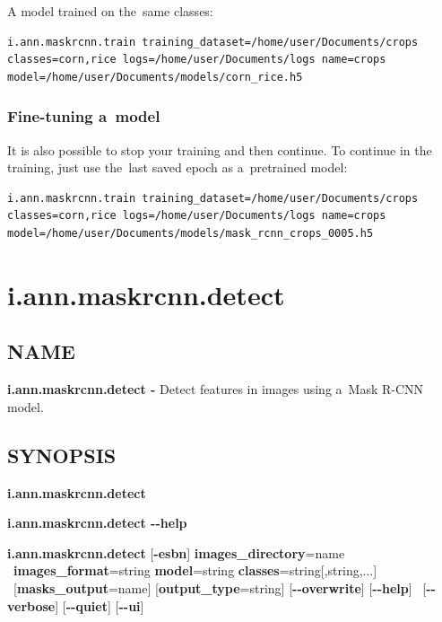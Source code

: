 A model trained on the~same classes:

{\footnotesize
\begin{lstlisting}[breaklines=true]
i.ann.maskrcnn.train training_dataset=/home/user/Documents/crops classes=corn,rice logs=/home/user/Documents/logs name=crops model=/home/user/Documents/models/corn_rice.h5
\end{lstlisting}
}

\subsubsection*{Fine-tuning a~model}
It is also possible to stop your training and then continue. To continue in the
training, just use the~last saved epoch as a~pretrained model:

{\footnotesize
\begin{lstlisting}[breaklines=true]
i.ann.maskrcnn.train training_dataset=/home/user/Documents/crops classes=corn,rice logs=/home/user/Documents/logs name=crops model=/home/user/Documents/models/mask_rcnn_crops_0005.h5
\end{lstlisting}
}

\clearpage

\section{i.ann.maskrcnn.detect}
\label{appendix-detect}

\subsection*{NAME}

\textbf{i.ann.maskrcnn.detect -} Detect features in images using a~Mask R-CNN
model.

\subsection*{SYNOPSIS}

\begin{flushleft}
\textbf{i.ann.maskrcnn.detect} 

\textbf{i.ann.maskrcnn.detect -{}-help}

\textbf{i.ann.maskrcnn.detect} [\textbf{-esbn}] \textbf{images\_directory}=name
\tab\ \textbf{images\_format}=string \textbf{model}=string
\textbf{classes}=string[,string,...] \tab\ [\textbf{masks\_output}=name]
[\textbf{output\_type}=string] [\textbf{-{}-overwrite}] [\textbf{-{}-help}]
\tab\ [\textbf{-{}-verbose}] [\textbf{-{}-quiet}] [\textbf{-{}-ui}]
\end{flushleft}

